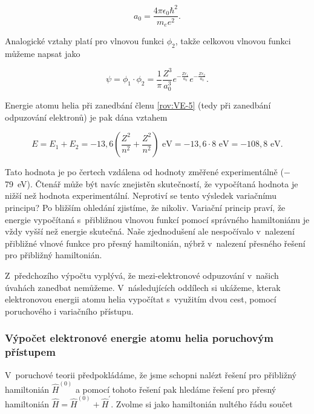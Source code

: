 \begin{equation}
a_0 = \frac{4 \pi \epsilon_0 \hbar^2}{m_e e^2}.
\label{rov:VE-9}
\end{equation}

\noindent Analogické vztahy platí pro vlnovou funkci $\phi_2$, takže celkovou vlnovou funkci můžeme napsat jako 

\begin{equation}
\psi = \phi_1 \cdot \phi_2 = \frac{1}{\pi} \frac{Z^3}{a_0^3} e^{-\frac{Z r_1}{a_0}} e^{-\frac{Z r_2}{a_0}}.
\label{rov:VE-10}
\end{equation}


\noindent Energie atomu helia při zanedbání členu \eqref{rov:VE-5} (tedy při zanedbání odpuzování elektronů) je pak dána vztahem

\begin{equation}
E = E_1 + E_2 = -13{,}6 \left(\frac{Z^2}{n^2} + \frac{Z^2}{n^2} \right) \mbox{ eV} = -13{,}6 \cdot 8 \mbox{ eV} = -108{,}8 \mbox{ eV}.
\label{rov:VE-11}
\end{equation}

Tato hodnota je po čertech vzdálena od hodnoty změřené experimentálně ($-$79~eV). Čtenář může být navíc znejistěn skutečností, že vypočítaná hodnota je nižší než hodnota experimentální. Neprotiví se tento výsledek variačnímu principu? Po bližším ohledání zjistíme, že nikoliv. Variační princip praví, že energie vypočítaná s~přibližnou vlnovou funkcí pomocí správného hamiltoniánu je vždy vyšší než energie skutečná. Naše zjednodušení ale nespočívalo v~nalezení přibližné vlnové funkce pro přesný hamiltonián, nýbrž v~nalezení přesného řešení pro přibližný hamiltonián. 

Z~předchozího výpočtu vyplývá, že mezi-elektronové odpuzování v~našich úvahách zanedbat nemůžeme. V~následujících oddílech si ukážeme, kterak elektronovou energii atomu helia vypočítat s~využitím dvou cest, pomocí poruchového i variačního přístupu.

\subsubsection{Výpočet elektronové energie atomu helia poruchovým přístupem}

V~poruchové teorii předpokládáme, že jsme schopni nalézt řešení pro přibližný hamiltonián $\hat{H}^{(0)}$ a pomocí tohoto řešení pak hledáme řešení pro přesný hamiltonián $\hat{H} = \hat{H}^{(0)} + \hat{H}^{\prime}$. Zvolme si jako hamiltonián nultého řádu součet


